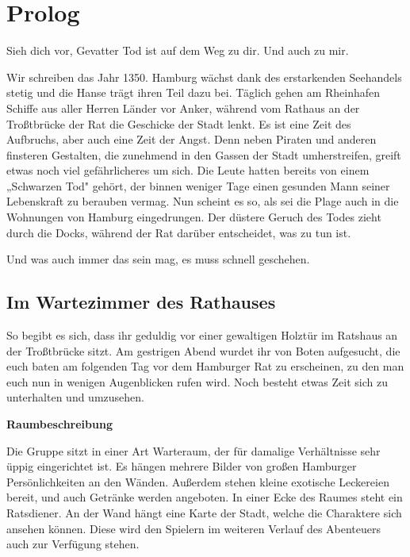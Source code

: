 
\chapter{Prolog}
\label{adventure}

\begin{advquote}
\large Sieh dich vor, Gevatter Tod ist auf dem Weg zu dir. Und auch zu mir.
\end{advquote}

Wir schreiben das Jahr 1350. Hamburg wächst dank des erstarkenden Seehandels stetig
und die Hanse trägt ihren Teil dazu bei. Täglich gehen am Rheinhafen Schiffe aus
aller Herren Länder vor Anker, während vom Rathaus an der Troßtbrücke der Rat die
Geschicke der Stadt lenkt. Es ist eine Zeit des Aufbruchs, aber auch eine Zeit der
Angst. Denn neben Piraten und anderen finsteren Gestalten, die zunehmend in den
Gassen der Stadt umherstreifen, greift etwas noch viel gefährlicheres um sich. Die
Leute hatten bereits von einem „Schwarzen Tod" gehört, der binnen weniger Tage einen
gesunden Mann seiner Lebenskraft zu berauben vermag. Nun scheint es so, als sei die
Plage auch in die Wohnungen von Hamburg eingedrungen. Der düstere Geruch des Todes
zieht durch die Docks, während der Rat darüber entscheidet, was zu tun ist.

Und was auch immer das sein mag, es muss schnell geschehen.
\vspace{0.7cm}

\section{Im Wartezimmer des Rathauses}
\label{sec:wartezimmer}

So begibt es sich, dass ihr geduldig vor einer gewaltigen Holztür im Ratshaus an der
Troßtbrücke sitzt. Am gestrigen Abend wurdet ihr von Boten aufgesucht, die euch baten
am folgenden Tag vor dem Hamburger Rat zu erscheinen, zu den man euch nun in wenigen
Augenblicken rufen wird. Noch besteht etwas Zeit sich zu unterhalten und umzusehen.

\vspace{0.3cm}

\begin{tcolorbox}

\vspace{0.7cm}
\centering\textbf{Raumbeschreibung}

\flushleft
Die Gruppe sitzt in einer Art Warteraum, der für damalige Verhältnisse sehr üppig
eingerichtet ist. Es hängen mehrere Bilder von großen Hamburger Persönlichkeiten an
den Wänden. Außerdem stehen kleine exotische Leckereien bereit, und auch Getränke
werden angeboten. In einer Ecke des Raumes steht ein Ratsdiener. An der Wand hängt
eine Karte der Stadt, welche die Charaktere sich ansehen können. Diese wird den
Spielern im weiteren Verlauf des Abenteuers auch zur Verfügung stehen.
\end{tcolorbox}

